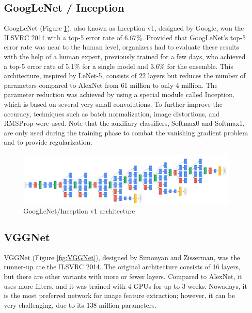 \subsection{GoogLeNet / Inception}
GoogLeNet \cite{Going-Deeper-with-Convolutions} (Figure \ref{fig:GoogLeNet}), also known as Inception v1, designed by Google, won the ILSVRC 2014 with a top-5 error rate of 6.67\%. Provided that GoogLe\-Net's top-5 error rate was near to the human level, organizers had to evaluate these results with the help of a human expert, previously trained for a few days, who achieved a top-5 error rate of 5.1\% for a single model and 3.6\% for the ensemble. This architecture, inspired by LeNet-5, consists of 22 layers but reduces the number of parameters compared to AlexNet from 61 million to only 4 million. The parameter reduction was achieved by using a special module called Inception, which is based on several very small convolutions. To further improve the accuracy, techniques such as batch normalization, image distortions, and RMSProp were used. Note that the auxiliary classifiers, Softmax0 and Softmax1, are only used during the training phase to combat the vanishing gradient problem and to provide regularization.

\begin{figure} [H]
	\centering
	\includegraphics[width=\textwidth]{Images/CNNArchitectures/GoogLeNet.png}
	\decoRule
	\caption[GoogLeNet/Inception v1 architecture]{GoogLeNet/Inception v1 architecture}
	\label{fig:GoogLeNet}
\end{figure}

\subsection{VGGNet}
VGGNet \cite{Very-Deep-Convolutional-Networks-for-Large-Scale-Image-Recognition} (Figure \ref{fig:VGGNet}), designed by Simonyan and Zisserman, was the runner-up ate the ILSVRC 2014. The original architecture consists of 16 layers, but there are other variants with more or fewer layers. Compared to AlexNet, it uses more filters, and it was trained with 4 GPUs for up to 3 weeks. Nowadays, it is the most preferred network for image feature extraction; however, it can be very challenging, due to its 138 million parameters.

